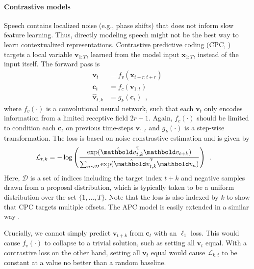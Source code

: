 {\paragraph{Contrastive models}
Speech contains localized noise (e.g., phase shifts) that does not inform slow feature learning. Thus, directly modeling speech might not be the best way to learn contextualized representations. Contrastive predictive coding (CPC,  \citealp{oord_representation_2018}) targets a local variable $\mathbf{v}_{1:T}$, learned from the model input $\mathbf{x}_{1:T}$, instead of the input itself. The forward pass is
%
\begin{align}
    \mathbf{v}_{t} &= f_{v}(\mathbf{x}_{t-r:t+r}) \label{eq_brief: cpc local representation} \\
    \mathbf{c}_{t} &= f_{c}(\mathbf{v}_{1:t}) \\
    \hat{\mathbf{v}}_{t,k} &= g_k(\mathbf{c}_{t}) \enspace,
\end{align}
%
\noindent where $f_v(\cdot)$ is a convolutional neural network, such that each $\mathbf{v}_{t}$ only encodes information from a limited receptive field $2r+1$. Again, $f_c(\cdot)$ should be limited to condition each $\mathbf{c}_t$ on previous time-steps $\mathbf{v}_{1:t}$ and $g_k(\cdot)$ is a step-wise transformation. The loss is based on noise constrastive estimation \cite{gutmann_noisecontrastive_2010} and is given by
\begin{align}
    \mathcal{L}_{t,k} &= - \log \left(\frac{\exp(\hat{\mathbf{v}}_{t,k}^{\text{\tiny T}}\mathbf{v}_{t+k})}{\sum_{n \sim \mathcal{D}} \exp(\hat{\mathbf{v}}_{t,k}^{\text{\tiny T}}\mathbf{v}_{n})} \right)\enspace .
    \label{eq_brief: cpc loss}
\end{align}
%
\noindent Here, $\mathcal{D}$ is a set of indices including the target index $t+k$ and negative samples drawn from a proposal distribution, which is typically taken to be a uniform distribution over the set $\{1,\dots,T\}$. Note that the loss is also indexed by $k$ to show that CPC targets multiple offsets. The APC model is easily extended in a similar way \cite{chung_improved_2020}.

Crucially, we cannot simply predict $\mathbf{v}_{t+k}$ from $\mathbf{c}_t$ with an $\ell_1$ loss. This would cause $f_v(\cdot)$ to collapse to a trivial solution, such as setting all $\mathbf{v}_t$ equal. With a contrastive loss on the other hand, setting all $\mathbf{v}_t$ equal would cause $\mathcal{L}_{k,t}$ to be constant at a value no better than a random baseline. 

}

